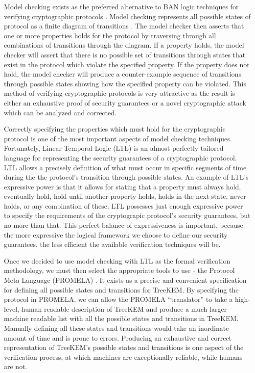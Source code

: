 \documentclass[12pt,twocolumn]{article}
\begin{document}
	
	Model checking exists as the preferred alternative to BAN logic techniques for verifying cryptographic protocols \cite{kacprzak2006comparing} \cite{lomuscio2007verification} \cite{van2004symbolic} . Model checking represents all possible states of protocol as a finite diagram of transitions \cite{clarke1981design}. The model checker then asserts that one or more properties holds for the protocol by traversing through all combinations of transitions through the diagram. If a property holds, the model checker will assert that there is no possible set of transitions through states that exist in the protocol which violate the specified property. If the property does not hold, the model checker will produce a counter-example sequence of transitions through possible states showing how the specified property can be violated. This method of verifying cryptographic protocols is very attractive as the result is either an exhaustive proof of security guarantees or a novel cryptographic attack which can be analyzed and corrected. 
	
	Correctly specifying the properties which must hold for the cryptographic protocol is one of the most important aspects of model checking techniques. Fortunately, Linear Temporal Logic (LTL) \cite{4567924} is an almost perfectly tailored language for representing the security guarantees of a cryptographic protocol. LTL allows a precisely definition of what must occur in specific segments of time during the the protocol's transition through possible states. An example of LTL's expressive power is that it allows for stating that a property must always hold, eventually hold, hold until another property holds, holds in the next state, never holds, or any combination of these. LTL possesses just enough expressive power to specify the requirements of the cryptograpic protocol's security guarantees, but no more than that. This perfect balance of expressiveness is important, because the more expressive the logical framework we choose to define our security guarantees, the less efficient the available verification techniques will be.
	
	Once we decided to use model checking with LTL as the formal verification methodology, we must then select the appropriate tools to use - the Protocol Meta Language (PROMELA) \cite{holzmann1990design}. It exists as a precise and convenient specification for defining all possible states and transitions for TreeKEM. By specifying the protocol in PROMELA, we can allow the PROMELA ``translator'' to take a high-level, human readable description of TreeKEM and produce a much larger machine readable list with all the possible states and transitions in TreeKEM. Manually defining all these states and transitions would take an inordinate amount of time and is prone to errors. Producing an exhaustive and correct representation of TreeKEM's possible states and transitions is one aspect of the verification process, at which machines are exceptionally reliable, while humans are not.
	
\end{document}
